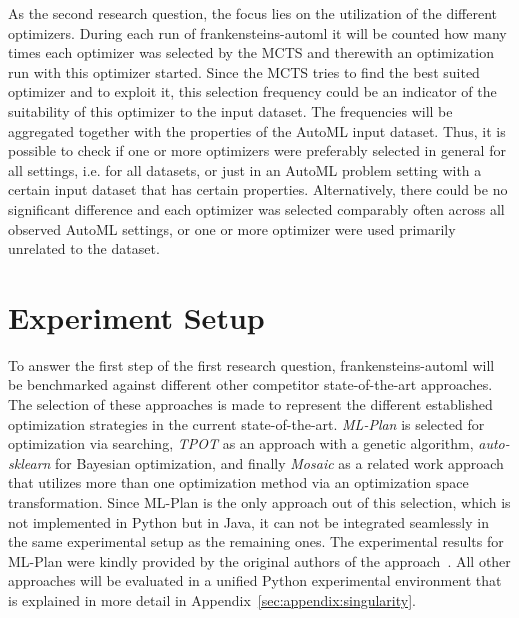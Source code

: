 As the second research question, the focus lies on the utilization of the different optimizers.
During each run of frankensteins-automl it will be counted how many times each optimizer was selected by the MCTS and therewith an optimization run with this optimizer started.
Since the MCTS tries to find the best suited optimizer and to exploit it, this selection frequency could be an indicator of the suitability of this optimizer to the input dataset.\newline
The frequencies will be aggregated together with the properties of the AutoML input dataset.
Thus, it is possible to check if one or more optimizers were preferably selected in general for all settings, i.e. for all datasets, or just in an AutoML problem setting with a certain input dataset that has certain properties.
Alternatively, there could be no significant difference and each optimizer was selected comparably often across all observed AutoML settings, or one or more optimizer were used primarily unrelated to the dataset.

\section{Experiment Setup}
\label{sec:evaluation:setup}
To answer the first step of the first research question, frankensteins-automl will be benchmarked against different other competitor state-of-the-art approaches.
The selection of these approaches is made to represent the different established optimization strategies in the current state-of-the-art.\newline
\textit{ML-Plan} is selected for optimization via searching, \textit{TPOT} as an approach with a genetic algorithm, \textit{auto-sklearn} for Bayesian optimization, and finally \textit{Mosaic} as a related work approach that utilizes more than one optimization method via an optimization space transformation.\newline
Since ML-Plan is the only approach out of this selection, which is not implemented in Python but in Java, it can not be integrated seamlessly in the same experimental setup as the remaining ones.
The experimental results for ML-Plan were kindly provided by the original authors of the approach~\textcite{Mohr-ML-Plan}.
All other approaches will be evaluated in a unified Python experimental environment that is explained in more detail in Appendix~\ref{sec:appendix:singularity}.

